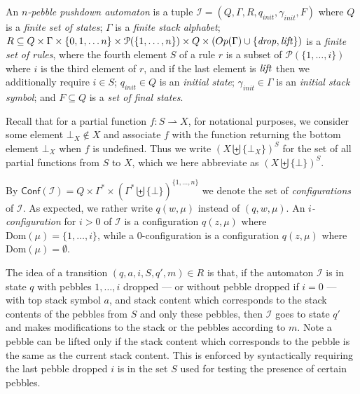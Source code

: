 \documentclass[a4paper,UKenglish,cleveref, autoref, thm-restate]{lipics-v2021}
\newcommand{\Conf}{\mathsf{Conf}}
\newcommand{\Op}{\mathsf{Op}}
\begin{document}
\newcommand{\ppda}{\mathcal{I}}


An {\em $n$-pebble pushdown automaton} 
is a tuple 
$\ppda = (Q, \Gamma,  R, q_{init}, \gamma_{init}, F)$
where $Q$ is a {\em finite set of  states}; $\Gamma$ is a {\em finite stack alphabet};
  $R  \subseteq  Q  \times \Gamma \times
		 \{ 0, 1, \ldots n\} \times \mathcal{P}(\{1,\ldots,n\})
		 \times Q  \times (\Op(\Gamma) \cup \{\text{\textit{drop}}, \text{\textit{lift}}\})$ is a {\em finite set of rules},
		 where the fourth element $S$ of a rule $r$ is a subset of 
		$\mathcal{P}(\{1,\ldots,i\})$ where $i$ is the third element of $r$,
		and if the last element is
		$\text{\textit{lift}}$ then we additionally require $i \in S$;
 $q_{init} \in Q$ is an {\em initial  state};
 $\gamma_{init} \in \Gamma$ is an {\em initial stack symbol}; and
 $F \subseteq Q$ is a {\em set of final  states}.




Recall that for a partial function $ f : S \rightharpoonup X $, for notational purposes, we consider some element $\bot_X \not\in X$ and 
 associate $f$ with the function returning the 
bottom element $\bot_X$ when $f$ is undefined. Thus we write $(X \biguplus \{ \bot_X \})^S$ for the set of all partial functions from $S$ to $X$, which we here abbreviate as $(X \biguplus \{ \bot \})^S$. 



 
 


By $\Conf(\ppda)=Q\times \Gamma^* \times (\Gamma^* \biguplus \{ \bot \})^{\{1, \ldots, n\}}$ we denote the set of
{\em configurations} of $\ppda$. As expected, we rather write $q(w, \mu)$ instead of $(q, w, \mu)$.
An {\em$i$-configuration} for $i > 0$ of $\ppda$ is a configuration $q(z,\mu)$ where
$\text{Dom}(\mu) = \{1, \ldots, i\}$, while a $0$-configuration is a configuration 
 $q(z,\mu)$ where $\text{Dom}(\mu)=\emptyset$.



The idea of a transition $(q, a, i, S, q', m) \in R$
is that, if the automaton $\ppda$ is in state $q$ with pebbles $1,\ldots, i$ dropped \---- or without pebble dropped if $i = 0$ \---- with top stack symbol $a$, and stack content which corresponds to the stack contents of the pebbles from $S$ and only these pebbles, then
$\ppda$ goes to state 
$q'$ and makes modifications to the stack or the pebbles according to
$m$. 
Note a pebble 
can be lifted only if the stack content which corresponds to the pebble
is the same as the current stack content. 
This is enforced by syntactically requiring
the last pebble dropped $i$ is in the set $S$ used for testing the presence of certain pebbles.
\end{document}
